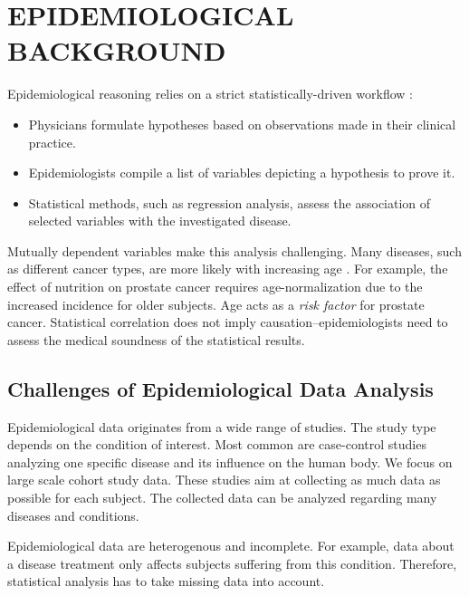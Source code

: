 \documentclass[a4paper,twoside]{style/article}
\begin{document}
\section{\uppercase{Epidemiological Background}}
\label{sec:EpidemiologicalBackground}
\noindent Epidemiological reasoning relies on a strict statistically-driven workflow \cite{Fletcher}:
\begin{itemize}
	\item Physicians formulate hypotheses based on observations made in their clinical practice.
	\item Epidemiologists compile a list of variables depicting a hypothesis to prove it.
	\item Statistical methods, such as regression analysis, assess the association of selected variables with the investigated disease.
\end{itemize}
Mutually dependent variables make this analysis challenging.
Many diseases, such as different cancer types, are more likely with increasing age \cite{Fletcher}.
For example, the effect of nutrition on prostate cancer requires age-normalization due to the increased incidence for older subjects.
Age acts as a \emph{risk factor} for prostate cancer.
Statistical correlation does not imply causation--epidemiologists need to assess the medical soundness of the statistical results.
\subsection{Challenges of Epidemiological Data Analysis}
Epidemiological data originates from a wide range of studies.
The study type depends on the condition of interest.
Most common are case-control studies analyzing one specific disease and its influence on the human body.
We focus on large scale cohort study data.
These studies aim at collecting as much data as possible for each subject.
The collected data can be analyzed regarding many diseases and conditions.

Epidemiological data are heterogenous and incomplete.
For example, data about a disease treatment only affects subjects suffering from this condition.
Therefore, statistical analysis has to take missing data into account.
\end{document}
